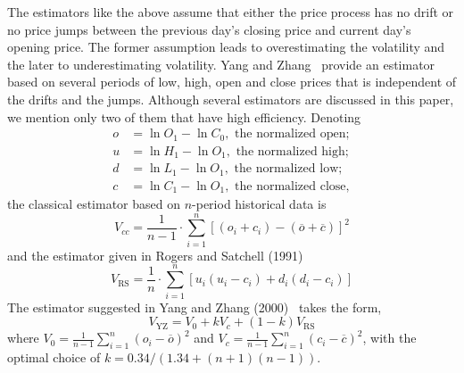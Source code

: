 The estimators like the above assume that either the price process has no drift or no price jumps between the previous day's closing price and current day's opening price. The former assumption leads to overestimating the volatility and the later to underestimating volatility. Yang and Zhang~\cite{yangzhang2000} provide an estimator based on several periods of low, high, open and close prices that is independent of the drifts and the jumps. Although several estimators are discussed in this paper, we mention only two of them that have high efficiency. Denoting
	\[
	\begin{aligned}
	o&= \ln O_1 - \ln C_0, \text{ the normalized open}; \\
	u&= \ln H_1 - \ln O_1, \text{ the normalized high}; \\
	d&= \ln L_1 - \ln O_1, \text{ the normalized low}; \\
	c&= \ln C_1 - \ln O_1,  \text{ the normalized close},
	\end{aligned}
	\]
the classical estimator based on $n$-period historical data is
	\begin{equation} \label{eqn:nperioddata}
	V_{cc}= \dfrac{1}{n-1} \cdot \sum_{i=1}^n [(o_i + c_i) - (\overline{o} + \overline{c})]^2
	\end{equation}
and the estimator given in Rogers and Satchell (1991)~\cite{rogerssatchell1991}
	\begin{equation} \label{eqn:rogerssatchell}
	V_{\text{RS}}= \dfrac{1}{n} \cdot \sum_{i=1}^n [u_i(u_i - c_i) + d_i(d_i-c_i)]
	\end{equation}
The estimator suggested in Yang and Zhang (2000)~\cite{yangzhang2000} takes the form,
	\begin{equation} \label{eqn:yang2000}
	V_{\text{YZ}}= V_0 + k V_c + (1-k)V_{\text{RS}}
	\end{equation}
where $V_0= \frac{1}{n-1} \sum_{i=1}^n (o_i - \overline{o})^2$ and $V_c= \frac{1}{n-1} \sum_{i=1}^n (c_i - \overline{c})^2$, with the optimal choice of $k= 0.34/(1.34 + (n+1)(n-1))$. \twomedskip


